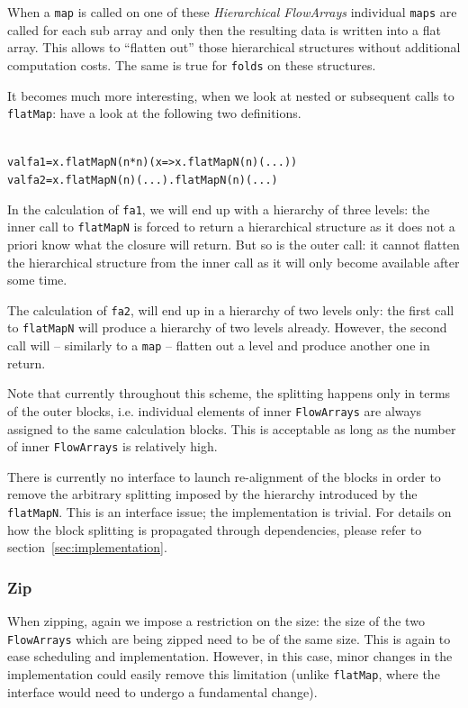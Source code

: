 \documentclass[runningheads,a4paper,fleqn]{llncs}
\begin{document}
When a \texttt{map} is called on one of these \emph{Hierarchical
  FlowArrays} individual \texttt{maps} are called for each sub array
and only then the resulting data is written into a flat array. This
allows to ``flatten out'' those hierarchical structures without
additional computation costs. The same is true for \texttt{folds} on
these structures.

It becomes much more interesting, when we look at nested or subsequent
calls to \texttt{flatMap}: have a look at the following two
definitions.
\begin{alltt}
{\scriptsize
val fa1 = x.flatMapN(n*n)(x => x.flatMapN(n)( ... ))
val fa2 = x.flatMapN(n)(...).flatMapN(n)(...)
}
\end{alltt}
In the calculation of \texttt{fa1}, we will end up with a hierarchy of
three levels: the inner call to \texttt{flatMapN} is forced to return
a hierarchical structure as it does not a priori know what the closure
will return. But so is the outer call: it cannot flatten the hierarchical
structure from the inner call as it will only become available after
some time.

The calculation of \texttt{fa2}, will end up in a hierarchy of
two levels only: the first call to \texttt{flatMapN} will produce a 
hierarchy of two levels already. However, the second call will --
similarly to a \texttt{map} -- flatten out a level and produce another
one in return.

Note that currently throughout this scheme, the splitting happens only
in terms of the outer 
blocks, i.e. individual elements of inner \texttt{FlowArrays} are always
assigned to the same calculation blocks. This is acceptable as long as
the number of inner \texttt{FlowArrays} is relatively high.

There is currently no interface to launch re-alignment of the blocks
in order to remove the arbitrary splitting imposed by the hierarchy
introduced by the \texttt{flatMapN}. This is an interface issue; the
implementation is trivial. For details on how the block splitting is
propagated through dependencies, please refer to
section~\ref{sec:implementation}.

\subsubsection{Zip}
When zipping, again we impose a restriction on the size: the size of
the two \texttt{FlowArrays} which are being zipped need to be of the same
size. This is again to ease scheduling and implementation. However, in
this case, minor changes in the implementation could easily remove
this limitation (unlike \texttt{flatMap}, where the interface would
need to undergo a fundamental change).
\end{document}
